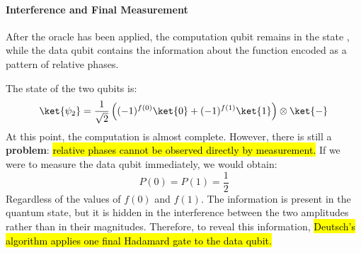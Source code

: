 \paragraph{Interference and Final Measurement}\label{ex:interference-and-final-measurement}

After the oracle has been applied, the computation qubit remains in the state \ket{-}, while the data qubit contains the information about the function encoded as a pattern of relative phases.

\highspace
The state of the two qubits is:
\begin{equation*}
    \ket{\psi_2} = \frac{1}{\sqrt{2}} \left( (-1)^{f(0)}\ket{0} + (-1)^{f(1)}\ket{1} \right) \otimes \ket{-}
\end{equation*}
\textcolor{Red2}{} At this point, the computation is almost complete. However, there is still a \textbf{problem}: \hl{relative phases cannot be observed directly by measurement.} If we were to measure the data qubit immediately, we would obtain:
\begin{equation*}
    P(0) = P(1) = \frac{1}{2}
\end{equation*}
Regardless of the values of $f(0)$ and $f(1)$. The information is present in the quantum state, but it is hidden in the interference between the two amplitudes rather than in their magnitudes. Therefore, to reveal this information, \hl{Deutsch's algorithm applies one final Hadamard gate to the data qubit.}

